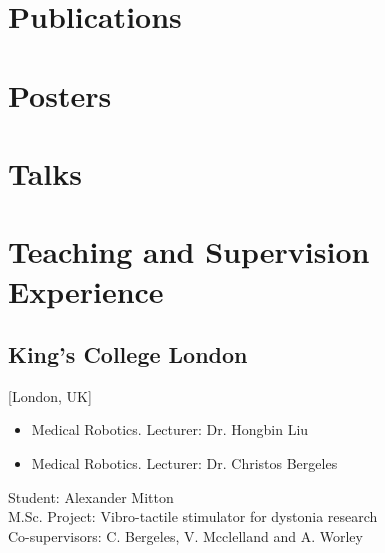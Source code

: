 \documentclass{mycv}
\begin{document}
\section{Publications}

\section{Posters}

\section{Talks}


\section{Teaching and Supervision \\ Experience}
\subsection{King's College London}[London, UK]
\begin{positions}
\end{positions}
\begin{itemize}
	\item Medical Robotics. Lecturer: Dr. Hongbin Liu  
	\item Medical Robotics. Lecturer: Dr. Christos Bergeles  
\end{itemize}
\vspace{\parskip}

\begin{positions}
\end{positions}
Student: Alexander Mitton  \\
M.Sc. Project: Vibro-tactile stimulator for dystonia research \\
Co-supervisors: C. Bergeles, V. Mcclelland and A. Worley 
\newpage
\end{document}

